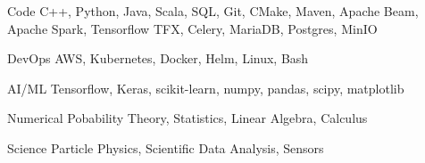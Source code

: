 

\begin{cvskills}

\cvskill
    {Code} %
    {C++, Python, Java, Scala, SQL, Git, CMake, Maven, 
    Apache Beam, Apache Spark, Tensorflow TFX, Celery, 
    MariaDB, Postgres, MinIO} %


\cvskill
    {DevOps} %
    {AWS, Kubernetes, Docker, Helm, Linux, Bash} %

\cvskill
    {AI/ML} %
    {Tensorflow, Keras, scikit-learn, numpy, pandas, scipy, matplotlib} %


\cvskill

\cvskill
    {Numerical} %
    {Pobability Theory, Statistics, Linear Algebra, Calculus} %

\cvskill
    {Science} %
    {Particle Physics, Scientific Data Analysis, Sensors} %




\end{cvskills}